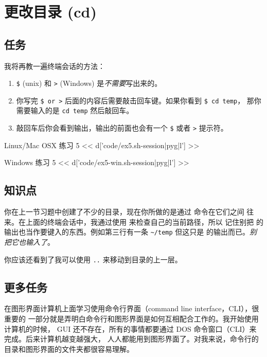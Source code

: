 \chapter{更改目录 (cd)}

\section{任务}

我将再教一遍终端会话的方法：

\begin{enumerate} 
\item \verb|$| (unix) 和 \verb|>| (Windows) 是\emph{不需要}写出来的。
\item 你写完 \verb|$ or >| 后面的内容后需要敲击回车键。如果你看到 \verb|$ cd temp|，
那你需要输入的是 \verb|cd temp| 然后敲回车。
\item 敲回车后你会看到输出，输出的前面也会有一个 \verb|$| 或者 \verb|>| 提示符。
\end{enumerate}

\begin{code}{Linux/Mac OSX 练习 5}
<< d['code/ex5.sh-session|pyg|l'] >>
\end{code}

\begin{code}{Windows 练习 5}
<< d['code/ex5-win.sh-session|pyg|l'] >>
\end{code}

\section{知识点}

你在上一节习题中创建了不少的目录，现在你所做的是通过  命令在它们之间
往来。在上面的终端会话中，我通过使用  来检查自己的当前路径，所以
记住别把  的输出也当作要键入的东西。例如第三行有一条 \verb|~/temp| 
但这只是  的输出而已。\emph{别把它也输入了}。

你应该还看到了我可以使用 \verb|..| 来移动到目录的上一层。


\section{更多任务}

在图形界面计算机上面学习使用命令行界面（command line interface，CLI），很重要的
一部分就是弄明白命令行和图形界面是如何互相配合工作的。我开始使用计算机的时候，
GUI 还不存在，所有的事情都要通过 DOS 命令窗口（CLI）来完成。后来计算机越变越强大，
人人都能用到图形界面了。对我来说，命令行的目录和图形界面的文件夹都很容易理解。

